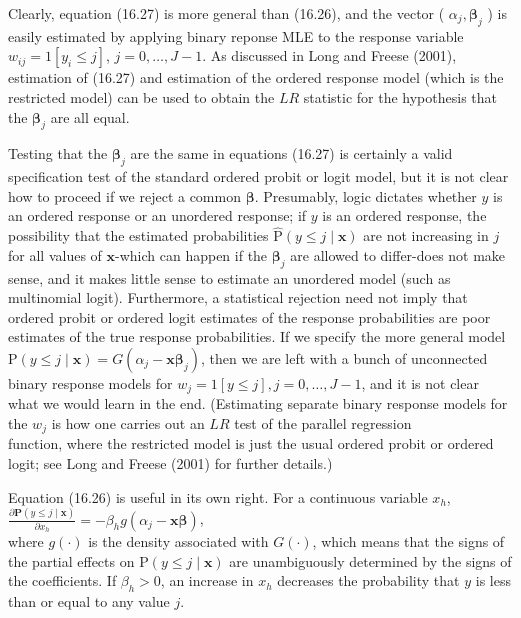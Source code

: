 \documentclass[10pt]{article}
\begin{document}
Clearly, equation (16.27) is more general than (16.26), and the vector ( $\alpha_{j}, \boldsymbol{\beta}_{j}$ ) is easily estimated by applying binary reponse MLE to the response variable $w_{i j}=1\left[y_{i} \leq j\right]$, $j=0, \ldots, J-1$. As discussed in Long and Freese (2001), estimation of (16.27) and estimation of the ordered response model (which is the restricted model) can be used to obtain the $L R$ statistic for the hypothesis that the $\boldsymbol{\beta}_{j}$ are all equal.

Testing that the $\boldsymbol{\beta}_{j}$ are the same in equations (16.27) is certainly a valid specification test of the standard ordered probit or logit model, but it is not clear how to proceed if we reject a common $\boldsymbol{\beta}$. Presumably, logic dictates whether $y$ is an ordered response or an unordered response; if $y$ is an ordered response, the possibility that the estimated probabilities $\hat{\mathrm{P}}(y \leq j \mid \mathbf{x})$ are not increasing in $j$ for all values of $\mathbf{x}$-which can happen if the $\boldsymbol{\beta}_{j}$ are allowed to differ-does not make sense, and it makes little sense to estimate an unordered model (such as multinomial logit). Furthermore, a statistical rejection need not imply that ordered probit or ordered logit estimates of the response probabilities are poor estimates of the true response probabilities. If we specify the more general model $\mathrm{P}(y \leq j \mid \mathbf{x})=G\left(\alpha_{j}-\mathbf{x} \boldsymbol{\beta}_{j}\right)$, then we are left with a bunch of unconnected binary response models for $w_{j}=1[y \leq j], j=0, \ldots, J-1$, and it is not clear what we would learn in the end. (Estimating separate binary response models for the $w_{j}$ is how one carries out an $L R$ test of the parallel regression\\
function, where the restricted model is just the usual ordered probit or ordered logit; see Long and Freese (2001) for further details.)

Equation (16.26) is useful in its own right. For a continuous variable $x_{h}$,\\
$\frac{\partial \mathbf{P}(y \leq j \mid \mathbf{x})}{\partial x_{h}}=-\beta_{h} g\left(\alpha_{j}-\mathbf{x} \boldsymbol{\beta}\right)$,\\
where $g(\cdot)$ is the density associated with $G(\cdot)$, which means that the signs of the partial effects on $\mathrm{P}(y \leq j \mid \mathbf{x})$ are unambiguously determined by the signs of the coefficients. If $\beta_{h}>0$, an increase in $x_{h}$ decreases the probability that $y$ is less than or equal to any value $j$.
\end{document}
